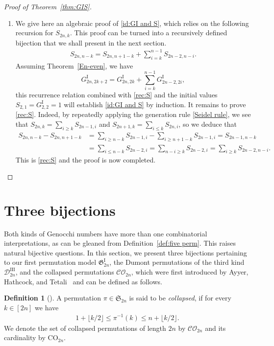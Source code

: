 \documentclass[11pt,reqno]{amsart}
\numberwithin{equation}{section}
\theoremstyle{plain}
\theoremstyle{definition}
\newtheorem{Def}[theorem]{Definition}
\newcommand{\D}{\mathcal{D}}
\renewcommand{\S}{\mathfrak{S}}
\newcommand{\fG}{\mathfrak{G}}
\newcommand{\GI}{\fG^{\mathrm{I}}}
\newcommand{\Gi}{G^{\mathrm{I}}}
\def\CO{\mathcal{CO}}
\def\Co{\mathrm{CO}}
\begin{document}
\begin{proof}[Proof of Theorem~\ref{thm:GIS}]
\begin{enumerate}[label=(\roman*)]
		
		
		
		
		
		
		
		\item We give here an algebraic proof of \eqref{id:GI and S}, which relies on the following recursion for $S_{2n,k}$. This proof can be turned into a recursively defined bijection that we shall present in the next section. 
		\begin{align}\label{rec:S}
			S_{2n,n-k}=S_{2n,n+1-k}+\sum_{i=k}^{n-1}S_{2n-2,n-i}.
		\end{align}
		Assuming Theorem~\ref{En-even}, we have $$\Gi_{2n,2k+2}=\Gi_{2n,2k}+\sum\limits_{i=k}^{n-1} \Gi_{2n-2,2i},$$
		this recurrence relation combined with \eqref{rec:S} and the initial values $S_{2,1}=\Gi_{2,2}=1$ will establish \eqref{id:GI and S} by induction. It remains to prove \eqref{rec:S}. Indeed, by repeatedly applying the generation rule \eqref{Seidel rule}, we see that $S_{2n,k}=\sum_{i\ge k}S_{2n-1,i}$ and $S_{2n+1,k}=\sum_{i\le k}S_{2n,i}$, so we deduce that
		\begin{align*}
			S_{2n,n-k}-S_{2n,n+1-k}&=\sum_{i\ge n-k} S_{2n-1,i}-\sum_{i\ge n+1-k} S_{2n-1,i}
			=S_{2n-1,n-k}\\
			&=\sum_{i\le n-k} S_{2n-2,i}
			=\sum_{n-i\geq k} S_{2n-2,i}
			=\sum_{i\geq k} S_{2n-2,n-i}.
		\end{align*}
		This is \eqref{rec:S} and the proof is now completed.
	\end{enumerate} 
\end{proof}

\section{Three bijections}\label{sec:bijs}
Both kinds of Genocchi numbers have more than one combinatorial interpretations, as can be gleaned from Definition~\ref{def:five perm}. This raises natural bijective questions. In this section, we present three bijections pertaining to our first permutation model $\GI_{2n}$, the Dumont permutations of the third kind $\D^{\mathrm{III}}_{2n}$, and the collapsed permutations $\CO_{2n}$, which were first introduced by Ayyer, Hathcock, and Tetali~\cite{AHT22} and can be defined as follows. 

\begin{Def}[{\cite[Definition~4.1]{AHT22}}] \label{collapsed permutation def}
	A permutation $\pi\in\S_{2n}$ is said to be \emph{collapsed}, if for every $k\in [2n]$ we have
	\begin{align} \label{defn:collapse}
		1+ \lfloor{k/2}\rfloor \leq \pi^{-1}(k) \leq n+\lfloor k/2 \rfloor.
	\end{align}
	We denote the set of collapsed permutations of length $2n$ by $\CO_{2n}$ and its cardinality by $\Co_{2n}$.
\end{Def}
\end{document}
